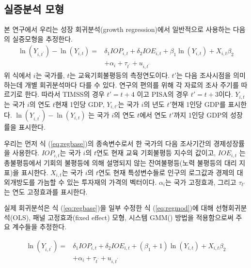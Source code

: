\subsection{실증분석 모형}

본 연구에서 우리는 성장 회귀분석(growth regression)에서 일반적으로 사용하는 다음의 실증모형을 추정한다.
\begin{equation}
 \begin{aligned}
 \ln \left(Y_{i, t^{\prime}}\right)-\ln \left(Y_{i, t}\right)=& \delta_{1} I O P_{i, t}+\delta_{2} I O E_{i, t}+\beta_{1} \ln \left(Y_{i, t}\right)+X_{i, t} \beta_{2} \\
 &+\alpha_{i}+\tau_{t^{\prime}}+u_{i, t^{\prime}}
 \end{aligned}
 \label{eq:regbase}
\end{equation} 
 위 식에서 $i$는 국가를, $t$는 교육기회불평등의 측정연도이다. $t'$는 다음 조사시점을 의미하는데 개별 회귀분석마다 다를 수 있다. 연구의 편의를 위해 각 자료의 조사 주기를 따르기로 한다. 따라서 TIMSS의 경우 $t'=t+4$ 이고 PISA의 경우  $t'=t+3$이다. $Y_{i,t}$는 국가 $i$의 연도 $t$현재 1인당 GDP, $Y_{i,t'}$는 국가 $i$의 년도 $t'$현재 1인당 GDP를 표시한다. $\ln \left(Y_{i, t^{\prime}}\right)-\ln \left(Y_{i, t}\right)$ 는 국가 $i$의 연도 $t$에서 연도 $t'$까지 1인당 GDP의 성장률을 표시한다. 
 
우리는 먼저 식 (\ref{eq:regbase})의 종속변수로서 한 국가의 다음 조사기간의 경제성장률을 사용한다. 
$IOP_{i,t}$는 국가 $i$의 $t$연도 현재 교육 기회불평등 지수의 값이고, $IOE_{i,t}$ 는 총불평등에서 기회의 불평등에 의해 설명되지 않는 잔여불평등(노력 불평등의 대리 지표)을 표시한다. $X_{i,t}$는 국가 $i$의 $t$연도 현재 특성변수들로 인구의 로그값과 경제의 대외개방도를 가늠할 수 있는 투자재의 가격의 벡터이다. $\alpha _i$는 국가 고정효과, 그리고 $\tau _{t'}$는 연도 고정효과를 표시한다.

실제 회귀분석은 식 (\ref{eq:regbase})을 일부 수정한 식 (\ref{eq:regmod})에 대해 선형회귀분석(OLS), 패널 고정효과(fixed effect) 모형, 시스템 GMM(\citet{bnb98}) 방법을 적용함으로써 주요 계수들을 추정한다.

\begin{equation}
 \begin{aligned}
 \ln \left(Y_{i, t^{\prime}}\right)=& \delta_{1} I O P_{i, t}+\delta_{2} I O E_{i, t}+\left(\beta_{1}+1\right) \ln \left(Y_{i, t}\right)+X_{i, t} \beta_{2} \\
 &+\alpha_{i}+\tau_{t^{\prime}}+u_{i, t^{\prime}}
 \end{aligned}
 \label{eq:regmod}
\end{equation}

